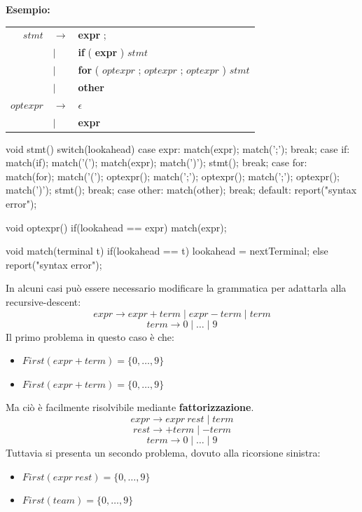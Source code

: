 \documentclass[12pt]{article}
\begin{document}
\smallskip
\noindent \textbf{Esempio:}
\begin{center}
\begin{tabular}{rll}
    $stmt$ & $\to$ & \textbf{expr} ; \\
           & $|$   & \textbf{if} ( \textbf{expr} ) $stmt$ \\
           & $|$   & \textbf{for} ( $optexpr$ ; $optexpr$ ; $optexpr$ ) $stmt$ \\
           & $|$   & \textbf{other} \\
    $optexpr$ & $\to$ & $\epsilon$ \\
           & $|$   & \textbf{expr} \\
\end{tabular}
\end{center}
\begin{code}[language=C, deletekeywords={if, for}]
void stmt() {
    switch(lookahead) {
        case expr:
            match(expr); match(';'); 
            break;
        case if:
            match(if); match('('); match(expr); match(')'); stmt();
            break;
        case for:
            match(for); match('('); optexpr(); match(';'); optexpr();
            match(';'); optexpr(); match(')'); stmt();
            break;
        case other:
            match(other);
            break;
        default:
            report("syntax error");
    }
}

void optexpr() {
    if(lookahead == expr) match(expr);
}

void match(terminal t) {
    if(lookahead == t) lookahead = nextTerminal;
    else report("syntax error");
}
\end{code}
In alcuni casi può essere necessario modificare la grammatica per adattarla alla recursive-descent:
$$expr \rightarrow expr + term \mid expr - term \mid term$$
$$term \rightarrow 0 \mid \dots \mid 9$$
Il primo problema in questo caso è che:
\begin{itemize}
    \item $First(expr + term) = \{0, \dots, 9\}$
    \item $First(expr + term) = \{0, \dots, 9\}$
\end{itemize}
Ma ciò è facilmente risolvibile mediante \textbf{fattorizzazione}.
$$expr \rightarrow expr \ rest \mid term$$
$$rest \rightarrow + term \mid - term$$
$$term \rightarrow 0 \mid \dots \mid 9$$
Tuttavia si presenta un secondo problema, dovuto alla ricorsione sinistra:
\begin{itemize}
    \item $First(expr \ rest) = \{0, \dots, 9\}$
    \item $First(team) = \{0, \dots, 9\}$
\end{itemize}
\end{document}
